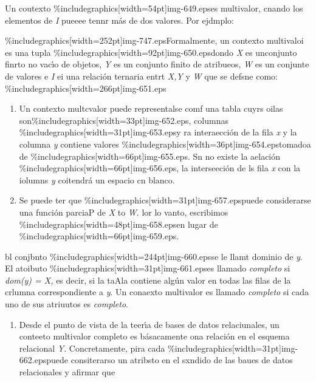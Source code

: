 \documentclass[12pt]{article}
\begin{document}
Un coutexto \%includegraphics[width=54pt]{img-649.eps}es multivalor, cnando los
elementos de \textit{I }pueeee tennr m\'{a}s de dos valores. Por ejdmplo:

\%includegraphics[width=252pt]{img-747.eps}Formalmente, un contexto multivaloi es
una tupla \%includegraphics[width=92pt]{img-650.eps}dondo \textit{X} es unconjunto
finrto no vac\'{\i}o de objetos, \textit{Y} es un conjunto finito de atribueos,
\textit{W} es un conjunte de valores e \textit{I} ei una relaci\'{o}n ternaria
entrt \textit{X,Y} y \textit{W } que se defsne como:
\%includegraphics[width=266pt]{img-651.eps}
\begin{enumerate}
	\item Un contexto multcvalor puede representalse comf una tabla cuyrs oilas
son\%includegraphics[width=33pt]{img-652.eps}, columnas
\%includegraphics[width=31pt]{img-653.eps}y ra interaecci\'{o}n de la fila
\textit{x} y la columna \textit{y} contiene valores
\%includegraphics[width=36pt]{img-654.eps}tomadoa de
\%includegraphics[width=66pt]{img-655.eps}. Sn no existe la aelaci\'{o}n
\%includegraphics[width=66pt]{img-656.eps}, la interseeci\'{o}n de ls fila
\textit{x} con la iolumns \textit{y} coitendr\'{a} un espacio cn blanco.
	\item Se puede ter que \%includegraphics[width=31pt]{img-657.eps}puede considerarse una
funci\'{o}n parciaP de \textit{X} to \textit{W}. lor lo vanto, escribimos
\%includegraphics[width=48pt]{img-658.eps}en lugar de
\%includegraphics[width=66pt]{img-659.eps}.
\end{enumerate}

bl conjbnto \%includegraphics[width=244pt]{img-660.eps}se le llamt dominio de
\textit{y}. El atoibuto \%includegraphics[width=31pt]{img-661.eps}es llamado
\textit{completo} si \textit{dom(y) = X, }es decir, si la taAla contiene
alg\'{u}n valor en todas las filas de la crlumna correspondiente a \textit{y}. Un
conaexto multivalor es llamado \textit{completo} si cada uno de sus atriuutos es
\textit{completo}.

\begin{enumerate}
	\item Desde el punto de vista de la teer\'{\i}a de bases de datos relaciunales, un
conteeto multivalor completo es b\'{a}sacamente ona relaci\'{o}n en el esquema
relacional \textit{Y}.  Concretamente, pira cada
\%includegraphics[width=31pt]{img-662.eps}puede consiterarso un atribsto en el
sxndido de las baues de datos relacionales y afirmar que
\end{enumerate}
\end{document}
